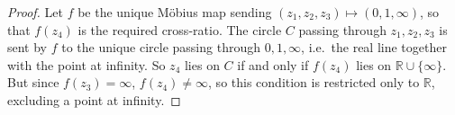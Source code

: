 \begin{proof}
	Let \(f\) be the unique M\"obius map sending \((z_1, z_2, z_3) \mapsto (0, 1, \infty)\), so that \(f(z_4)\) is the required cross-ratio.
	The circle \(C\) passing through \(z_1, z_2, z_3\) is sent by \(f\) to the unique circle passing through \(0, 1, \infty\), i.e.\ the real line together with the point at infinity.
	So \(z_4\) lies on \(C\) if and only if \(f(z_4)\) lies on \(\mathbb R \cup \{ \infty \}\).
	But since \(f(z_3) = \infty\), \(f(z_4) \neq \infty\), so this condition is restricted only to \(\mathbb R\), excluding a point at infinity.
\end{proof}
